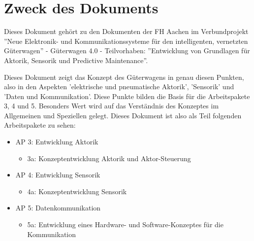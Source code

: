 \section*{Zweck des Dokuments}
Dieses Dokument gehört zu den Dokumenten der FH Aachen im Verbundprojekt ''Neue Elektronik- und Kommunikationssysteme für den intelligenten, vernetzten Güterwagen'' - Güterwagen 4.0 - Teilvorhaben: ''Entwicklung von Grundlagen für Aktorik, Sensorik und Predictive Maintenance''.\par
Dieses Dokument zeigt das Konzept des Güterwagens in genau diesen Punkten, also in den Aspekten 'elektrische und pneumatische Aktorik', 'Sensorik' und 'Daten und Kommunikation'. Diese Punkte bilden die Basis für die Arbeitspakete 3, 4 und 5. Besonders Wert wird auf das Verständnis des Konzeptes im Allgemeinen und Speziellen gelegt.
Dieses Dokument ist also als Teil folgenden Arbeitspakete zu sehen:
\begin{itemize}
    \item AP 3: Entwicklung Aktorik
    \begin{itemize}
        \item 3a: Konzeptentwicklung Aktorik und Aktor-Steuerung
    \end{itemize}
    \item AP 4: Entwicklung Sensorik
    \begin{itemize}
        \item 4a: Konzeptentwicklung Sensorik
    \end{itemize}
    \item AP 5: Datenkommunikation
    \begin{itemize}
        \item 5a: Entwicklung eines Hardware- und Software-Konzeptes für die Kommunikation
    \end{itemize}
\end{itemize}
